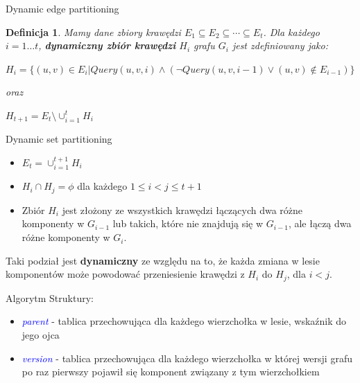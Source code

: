 \documentclass{beamer}
\newtheorem{df}{Definicja}
\newcommand{\emp}[1]{\textcolor{blue}{\textit{#1}}}
\begin{document}
\begin{frame}{Dynamic edge partitioning}
\begin{df}
Mamy dane zbiory krawędzi $E_1 \subseteq E_2 \subseteq \cdots \subseteq E_t$. Dla każdego $i=1\dots t$, \textbf{dynamiczny zbiór krawędzi} $H_i$ grafu $G_i$ jest zdefiniowany jako:

\vspace{0.4cm}
{\small $H_i = \{(u,v)\in E_i | Query(u,v,i) \wedge (\neg Query(u,v,i-1) \vee (u,v) \notin E_{i-1})\}$}

\vspace{0.4cm}
oraz

\vspace{0.4cm}
{\small $H_{t+1} = E_t \setminus \cup^t_{i=1}H_i$}

\end{df}
\end{frame}

\begin{frame}{Dynamic set partitioning}
\begin{itemize}
\item $E_t = \cup^{t+1}_{i=1}H_i$
\item $H_i \cap H_j = \phi$ dla każdego $1 \leq i < j \leq t+1$
\item Zbiór $H_i$ jest złożony ze wszystkich krawędzi łączących dwa różne komponenty w $G_{i-1}$ lub takich, które nie znajdują się w $G_{i-1}$, ale łączą dwa różne komponenty w $G_i$.
\end{itemize}

\begin{block}{}
Taki podział jest \textbf{dynamiczny} ze względu na to, że każda zmiana w lesie komponentów może powodować przeniesienie krawędzi z $H_i$ do $H_j$, dla $i < j$.
\end{block}
\end{frame}

\begin{frame}{Algorytm}
Struktury:
\begin{itemize}
\item \emp{parent} - tablica przechowująca dla każdego wierzchołka w lesie, wskaźnik do jego ojca
\item \emp{version} - tablica przechowująca dla każdego wierzchołka w której wersji grafu po raz pierwszy pojawił się komponent związany z tym wierzchołkiem
\end{itemize}
\end{frame}
\end{document}
